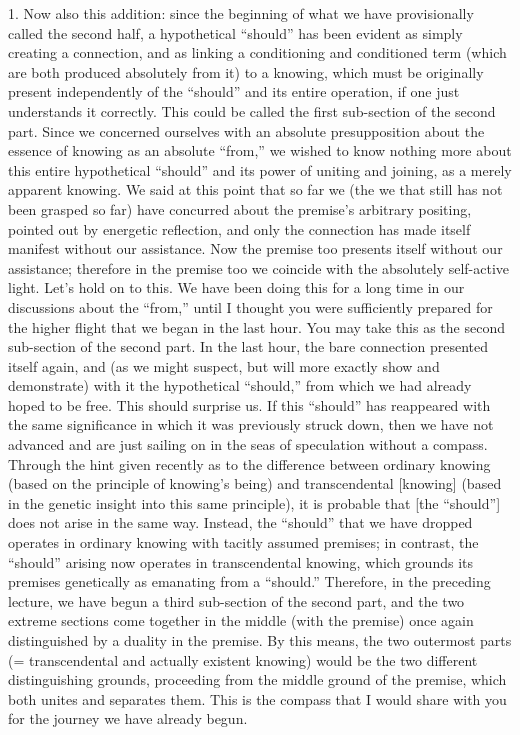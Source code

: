 1. Now also this addition:
since the beginning of what we
have provisionally called the second half,
a hypothetical “should” has been evident
as simply creating a connection,
and as linking a conditioning and conditioned term
(which are both produced absolutely from it)
to a knowing, which must be originally present
independently of the “should”
and its entire operation,
if one just understands it correctly.
This could be called the first
sub-section of the second part.
Since we concerned ourselves with
an absolute presupposition about
the essence of knowing as an absolute “from,”
we wished to know nothing more about
this entire hypothetical “should”
and its power of uniting and joining,
as a merely apparent knowing.
We said at this point that so far we
(the we that still has not been grasped so far)
have concurred about the premise’s arbitrary positing,
pointed out by energetic reflection,
and only the connection has made itself manifest
without our assistance.
Now the premise too presents itself without our assistance;
therefore in the premise too we coincide
with the absolutely self-active light.
Let’s hold on to this.
We have been doing this for a long time
in our discussions about the “from,”
until I thought you were sufficiently prepared for
the higher flight that we began in the last hour.
You may take this as the second sub-section of the second part.
In the last hour, the bare connection presented itself again,
and (as we might suspect, but will more exactly show and demonstrate)
with it the hypothetical “should,”
from which we had already hoped to be free.
This should surprise us.
If this “should” has reappeared with the same significance
in which it was previously struck down,
then we have not advanced
and are just sailing on
in the seas of speculation without a compass.
Through the hint given recently as to
the difference between ordinary knowing
(based on the principle of knowing’s being)
and transcendental [knowing]
(based in the genetic insight into this same principle),
it is probable that [the “should”] does
not arise in the same way.
Instead, the “should” that we have dropped
operates in ordinary knowing
with tacitly assumed premises;
in contrast, the “should” arising now
operates in transcendental knowing,
which grounds its premises genetically
as emanating from a “should.”
Therefore, in the preceding lecture,
we have begun a third sub-section of the second part,
and the two extreme sections come together
in the middle (with the premise) once again
distinguished by a duality in the premise.
By this means, the two outermost parts
(= transcendental and actually existent knowing)
would be the two different distinguishing grounds,
proceeding from the middle ground of the premise,
which both unites and separates them.
This is the compass that I would share with you
for the journey we have already begun.

